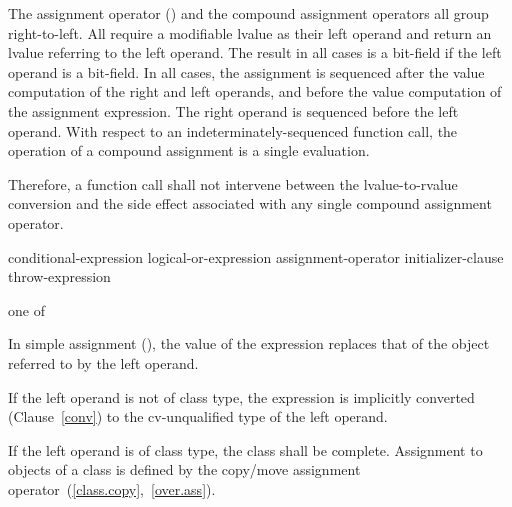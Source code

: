 \pnum
{}%
%
%
%
%
%
%
%
%
%
%
%
The assignment operator (\tcode{=}) and the compound assignment
operators all group right-to-left.
%
All
require a modifiable lvalue as their left operand and return an lvalue
referring to the left operand. The result in all cases is a bit-field if
the left operand is a bit-field. In all cases, the assignment is
sequenced after the
%
value computation of the right and left operands,
and before the
value computation of the assignment expression.
The right operand is sequenced before the left operand.
With
respect to an indeterminately-sequenced function call, the operation of
a compound assignment is a single evaluation.
\begin{note}
Therefore, a function call shall not intervene between the
lvalue-to-rvalue conversion and the side effect associated with any
single compound assignment operator.
\end{note}

\begin{bnf}
\br
    conditional-expression\br
    logical-or-expression assignment-operator initializer-clause\br
    throw-expression
\end{bnf}

\begin{bnf}
 \textnormal{one of}\br
    \terminal{=  *=  /=  \%=   +=  -=  \shr=  \shl=  \&=  \caret=  |=}
\end{bnf}

\pnum
In simple assignment (\tcode{=}), the value of the expression replaces
that of the object referred to by the left operand.

\pnum
{}%
If the left operand is not of class type, the expression is implicitly
converted (Clause~\ref{conv}) to the cv-unqualified type of the left
operand.

\pnum
{}%
%
If the left operand is of class type, the class shall be complete.
Assignment to objects of a class is defined by the copy/move assignment
operator~(\ref{class.copy},~\ref{over.ass}).


